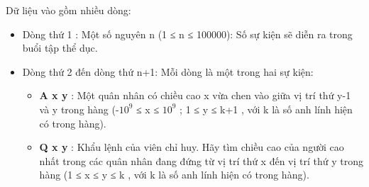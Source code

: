 Dữ liệu vào gồm nhiều dòng:  
\begin{itemize}
	\item     Dòng thứ 1 : Một số nguyên n (1 ≤ n ≤ 100000): Số sự kiện sẽ diễn ra trong buổi tập thể dục.   
	\item     Dòng thứ 2 đến dòng thứ n+1: Mỗi dòng là một trong hai sự kiện:    
\begin{itemize}
	\item \textbf{       A x y      }      : Một quân nhân có chiều cao x vừa chen vào giữa vị trí thứ y-1 và y trong hàng (-$10^{9}$      ≤ x ≤ $10^{9}$      ; 1 ≤ y ≤ k+1 , với k là số anh lính hiện có trong hàng).     
	\item \textbf{       Q x y      }      : Khẩu lệnh của viên chỉ huy. Hãy tìm chiều cao của người cao nhất trong các quân nhân đang đứng từ vị trí thứ x đến vị trí thứ y trong hàng (1 ≤ x ≤ y ≤ k , với k là số anh lính hiện có trong hàng).     
\end{itemize}
\end{itemize}